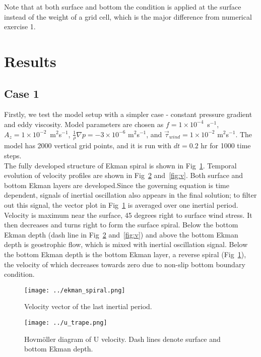 \documentclass{article}
\begin{document}
Note that at both surface and bottom the condition is applied at the surface instead of the weight of a grid cell, which is the major difference from numerical exercise 1.\\

\section{Results}
\subsection{Case 1}
Firstly, we test the model setup with a simpler case - constant pressure gradient and eddy viscosity. Model parameters are chosen as $f=1\times10^{-4}$~s$^{-1}$, $A_z=1\times10^{-2}$~m$^2$s$^{-1}$, $\frac{1}{\rho}\nabla p=-3\times10^{-6}$ m$^2$s$^{-1}$, and $\vec{\tau}_{wind}=1\times10^{-2}$ m$^2$s$^{-1}$. The model has 2000 vertical grid points, and it is run with $dt=0.2$ hr for 1000 time steps.\\

The fully developed structure of Ekman spiral is shown in Fig~\ref{fig:spiral}. Temporal evolution of velocity profiles are shown in Fig~\ref{fig:u} and~\ref{fig:v}. Both surface and bottom Ekman layers are developed.Since the governing equation is time dependent, signals of inertial oscillation also appears in the final solution; to filter out this signal, the vector plot in Fig~\ref{fig:spiral} is averaged over one inertial period.\\

Velocity is maximum near the surface, 45 degrees right to surface wind stress. It then decreases and turns right to form the surface spiral. Below the bottom Ekman depth (dash line in Fig~\ref{fig:u} and~\ref{fig:v}) and above the bottom Ekman depth is geostrophic flow, which is mixed with inertial oscillation signal. Below the bottom Ekman depth is the bottom Ekman layer, a reverse spiral (Fig~\ref{fig:spiral}), the velocity of which decreases towards zero due to non-slip bottom boundary condition.\\

\begin{figure}
  \centerline{\texttt{[image: ../ekman\_spiral.png]}}
  \caption{Velocity vector of the last inertial period.}
  \label{fig:spiral}
\end{figure}

\begin{figure}
  \centerline{\texttt{[image: ../u\_trape.png]}}
  \caption{Hovm\"{o}ller diagram of U velocity. Dash lines denote surface and bottom Ekman depth.}
  \label{fig:u}
\end{figure}
\end{document}
